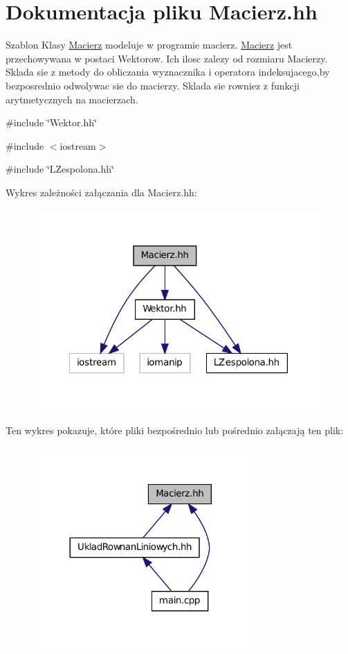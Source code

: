 \hypertarget{_macierz_8hh}{
\section{Dokumentacja pliku Macierz.hh}
\label{_macierz_8hh}
}


Szablon Klasy \hyperlink{class_macierz}{Macierz} modeluje w programie macierz. \hyperlink{class_macierz}{Macierz} jest przechowywana w postaci Wektorow. Ich ilosc zalezy od rozmiaru Macierzy. Sklada sie z metody do obliczania wyznacznika i operatora indeksujacego,by bezposrednio odwolywac sie do macierzy. Sklada sie rowniez z funkcji arytmetycznych na macierzach.  


{\ttfamily \#include \char`\"{}Wektor.hh\char`\"{}}\par
{\ttfamily \#include $<$iostream$>$}\par
{\ttfamily \#include \char`\"{}LZespolona.hh\char`\"{}}\par
Wykres zależności załączania dla Macierz.hh:\nopagebreak
\begin{figure}[H]
\begin{center}
\leavevmode
\includegraphics[width=316pt]{_macierz_8hh__incl}
\end{center}
\end{figure}
Ten wykres pokazuje, które pliki bezpośrednio lub pośrednio załączają ten plik:\nopagebreak
\begin{figure}[H]
\begin{center}
\leavevmode
\includegraphics[width=233pt]{_macierz_8hh__dep__incl}
\end{center}
\end{figure}
